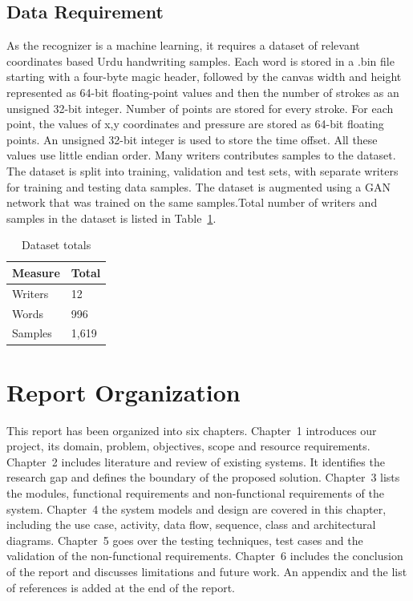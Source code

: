 \documentclass[12pt,a4paper]{report}
\begin{document}
\subsection{Data Requirement}
As the recognizer is a machine learning, it requires a dataset of relevant coordinates based Urdu handwriting samples. Each word is stored in a .bin file starting with a four-byte magic header, followed by the canvas width and height represented as 64-bit floating-point values and then the number of strokes as an unsigned 32-bit integer. Number of points are stored for every stroke.
For each point, the values of x,y coordinates and pressure are stored as 64-bit floating points. An unsigned 32-bit integer is used to store the time offset. All these values use little endian order. Many writers contributes samples to the dataset. The dataset is split into training, validation and test sets, with separate writers for training and testing data samples. The dataset is augmented using a GAN network that was trained on the same samples.Total number of writers and samples in the dataset is listed in Table~\ref{tab:dataset}. 

\begin{table}[H]
\caption{Dataset totals}\label{tab:dataset}
\centering\renewcommand{\arraystretch}{1.2}
\begin{tabular}{|p{2.8in}|p{2.2in}|}
\hline
\textbf{Measure} & \textbf{Total}\\\hline
Writers & 12 \\\hline
Words & 996 \\\hline
Samples & 1,619\\\hline
\end{tabular}
\end{table}

\section{Report Organization}
This report has been organized into six chapters. Chapter~1 introduces our project, its domain, problem, objectives, scope and resource requirements. Chapter~2 includes literature and review of existing systems. It identifies the research gap and defines the boundary of the proposed solution. Chapter~3 lists the modules, functional requirements and non-functional requirements of the system. Chapter~4 the system models and design are covered in this chapter, including the use case, activity, data flow, sequence, class and architectural diagrams. Chapter~5 goes over the testing techniques, test cases and the validation of the non-functional requirements. Chapter~6 includes the conclusion of the report and discusses limitations and future work. An appendix and the list of references is added at the end of the report.
\end{document}
